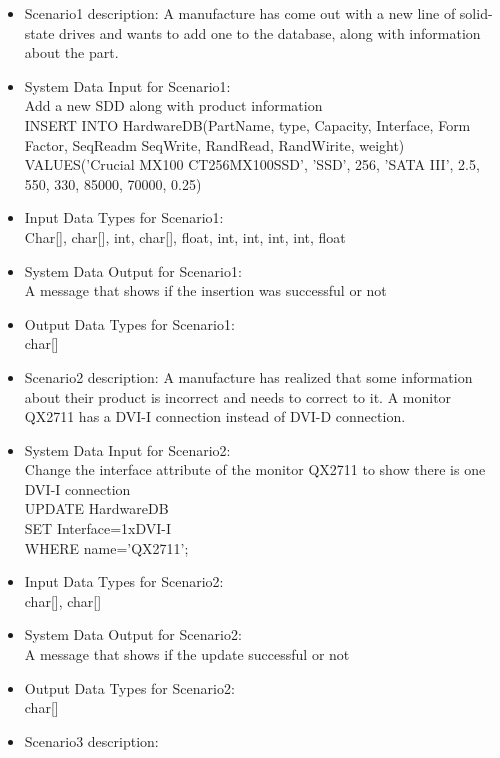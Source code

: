 {\begin{itemize}
\begin{itemize}
	\begin{itemize} 
	\item{Scenario1 description: }
	A manufacture has come out with a new line of solid-state drives and wants to add one to the database, along with information about the part.
	\item{System Data Input for Scenario1: }
	\\Add a new SDD along with product information \\INSERT INTO HardwareDB(PartName, type, Capacity, Interface, Form Factor, SeqReadm SeqWrite, RandRead, RandWirite, weight)\\VALUES('Crucial MX100 CT256MX100SSD', 'SSD', 256, 'SATA III', 2.5, 550, 330, 85000, 70000, 0.25)
	\item{Input Data Types for Scenario1: }
	\\Char[], char[], int, char[], float, int, int, int, int, float
	\item{System Data Output for Scenario1: }
	\\A message that shows if the insertion was successful or not
	\item{Output Data Types for Scenario1: }
	\\char[]
	\end{itemize}
	\begin{itemize} 
	\item{Scenario2 description: }
	A manufacture has realized that some information about their product is incorrect and needs to correct to it. A monitor QX2711 has a DVI-I connection instead of DVI-D connection.
	\item{System Data Input for Scenario2: }
	\\ Change the interface attribute of the monitor QX2711 to show there is one DVI-I connection\\UPDATE HardwareDB\\ SET Interface=1xDVI-I \\WHERE name='QX2711';
	\item{Input Data Types for Scenario2: }
\\char[], char[]
	\item{System Data Output for Scenario2: }
\\A message that shows if the update successful or not
	\item{Output Data Types for Scenario2: }
\\char[]
	\end{itemize}
	\begin{itemize} 
	\item{Scenario3 description: }

\end{itemize}
\end{itemize}
\end{itemize}}
